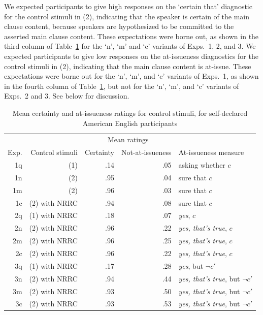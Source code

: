 \documentclass[11pt,fleqn]{article}
\newcommand{\6}{\mbox{$[\hspace*{-.6mm}[$}}
\newcommand{\9}{\mbox{$]\hspace*{-.6mm}]$}}
\begin{document}
We expected participants to give high responses on the `certain that' diagnostic for the control stimuli in (2), indicating that the speaker is certain of the main clause content, because speakers are hypothesized to be committed to the asserted main clause content. These expectations were borne out, as shown in the third column of Table~\ref{t-controls} for the `n', `m' and `c' variants of Exps.~1, 2, and 3. We expected participants to give low responses on the at-issueness diagnostics for the control stimuli in (2), indicating that the main clause content is at-issue. These expectations were borne out for the `n', `m', and `c' variants of Exps.~1, as shown in the fourth column of Table~\ref{t-controls}, but not for the `n', `m', and `c' variants of Exps.~2 and 3. See below for discussion.

\begin{table}[h!]
\centering
\begin{tabular}{r r r r l }
& &  \multicolumn{2}{c}{Mean ratings} &  \\ 
Exp. & Control stimuli & Certainty & Not-at-issueness & At-issueness measure \\ 
\hline
1q & (1) & .14 & .05  & asking whether $c$ \\
1n & (2) &  .95 & .04 & sure that $c$\\
1m & (2) & .96 & .03 & sure that $c$\\
1c & (2) with NRRC & .94  & .08 & sure that $c$\\
\hline
2q & (1) with NRRC & .18 & .07 & {\em yes}, $c$\\
2n & (2) with NRRC& .96 & .22 & {\em yes, that's true}, $c$\\
2m & (2) with NRRC& .96 & .25 & {\em yes, that's true}, $c$\\
2c & (2) with NRRC& .96 & .22 & {\em yes, that's true}, $c$\\
\hline
3q & (1) with NRRC & .17 &  .28 & {\em yes}, but $\neg c'$\\
3n & (2) with NRRC & .94 & .44 & {\em yes, that's true}, but $\neg c'$\\
3m & (2) with NRRC & .93 & .50 & {\em yes, that's true}, but $\neg c'$\\
3c & (2) with NRRC & .93 & .53 & {\em yes, that's true}, but $\neg c'$\\
\hline
\end{tabular}
\caption{Mean certainty and at-issueness ratings for control stimuli, for self-declared American English participants}\label{t-controls}
\end{table}
\end{document}
